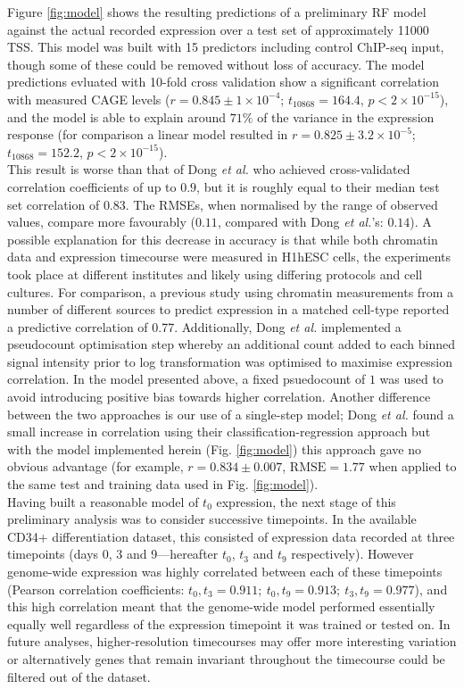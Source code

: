 \documentclass[a4paper,10pt,oneside]{book}
\begin{document}
Figure \ref{fig:model} shows the resulting predictions of a
preliminary RF model against the actual recorded expression over a
test set of approximately 11000 TSS. This model was built with 15
predictors including control ChIP-seq input, though some of these could be
removed without loss of accuracy. The model predictions evluated with
10-fold cross validation show a
significant correlation with measured CAGE levels ($ r = 0.845\pm
1 \times 10^{-4}$; $t_{10868} = 164.4$,
$p < 2 \times 10^{-15}$), and the model is able to explain around
$71\%$ of the variance in the expression response (for comparison a
linear model resulted in $r = 0.825 \pm 3.2 \times 10^{-5}$; $t_{10868} = 152.2$,
$p < 2 \times 10^{-15}$). \\

This result is worse than that of Dong \emph{et al.}
who achieved cross-validated correlation coefficients of up to $0.9$,
but it is roughly equal to their median test set correlation of
$0.83$.\cite{Dong2012} The RMSEs, when normalised by the range of
observed values, compare more favourably ($0.11$, compared with Dong \emph{et al.}'s: $0.14$). A possible explanation for this decrease in
accuracy is that while both chromatin data and expression timecourse
were measured in H1hESC cells, the experiments took place at
different institutes and likely using differing protocols and cell cultures. For comparison, a previous study using chromatin
measurements from a number of different sources to predict expression
in a matched cell-type reported a predictive correlation of 0.77.\cite{Karlic2010} Additionally, Dong \emph{et al.} implemented a pseudocount
optimisation step whereby an additional count added to each binned signal
intensity prior to log transformation was optimised to maximise
expression correlation. In the model presented above, a fixed
psuedocount of $1$ was used to avoid introducing positive bias towards
higher correlation. Another difference between the two approaches is
our use of a single-step model; Dong \emph{et al.} found a small
increase in correlation using their classification-regression approach
but with the model implemented herein (Fig. \ref{fig:model}) this approach gave no obvious advantage (for
example, $r
= 0.834 \pm 0.007$, $\textrm{RMSE} = 1.77$ when applied to the same test and
training data used in Fig. \ref{fig:model}). \\

Having built a reasonable model of $t_0$ expression, the next stage of
this preliminary analysis was to consider successive timepoints. In the
available CD34+ differentiation dataset, this consisted of expression
data recorded at three
timepoints (days 0, 3 and 9---hereafter $t_0$, $t_3$ and $t_9$
respectively). However genome-wide expression
was highly correlated between each of these timepoints (Pearson correlation coefficients: $t_0, t_3 = 0.911; ~t_0,t_9 =
0.913; ~t_3,t_9 = 0.977$), and this high correlation meant that the
genome-wide model performed essentially equally well regardless of the
expression timepoint it was trained or tested on. In future analyses, higher-resolution timecourses may offer
more interesting variation or alternatively genes that remain invariant
throughout the timecourse could be filtered out of the dataset. 


\begin{small}

\end{small}
\end{document}
